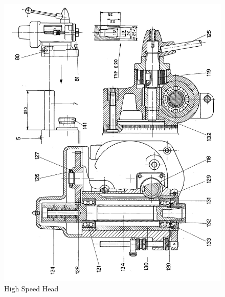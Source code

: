 \newpage
\begin{figure}[h]
    \centering
    \includegraphics[width=1.0\linewidth]{images/page_41}
    \caption{High Speed Head}
    \label{fig:high_speed_head}
\end{figure}
